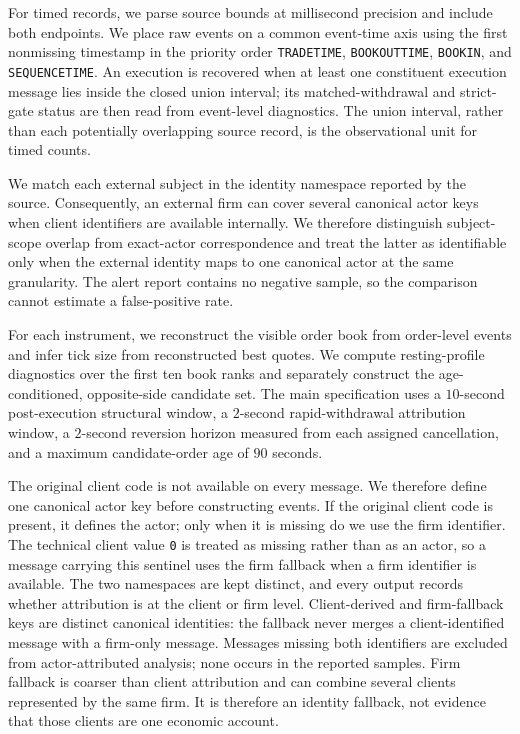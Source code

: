 \documentclass[11pt]{article}
\begin{document}
For timed records, we parse source bounds at millisecond precision and include both endpoints. We place raw events on a
common event-time axis using the first nonmissing timestamp in the priority order \texttt{TRADETIME}, \texttt{BOOKOUTTIME},
\texttt{BOOKIN}, and \texttt{SEQUENCETIME}. An execution is recovered when at least one constituent execution message lies
inside the closed union interval; its matched-withdrawal and strict-gate status are then read from event-level diagnostics.
The union interval, rather than each potentially overlapping source record, is the observational unit for timed counts.

We match each external subject in the identity namespace reported by the source. Consequently, an external firm can cover
several canonical actor keys when client identifiers are available internally. We therefore distinguish subject-scope overlap
from exact-actor correspondence and treat the latter as identifiable only when the external identity maps to one canonical
actor at the same granularity. The alert report contains no negative sample, so the comparison cannot estimate a
false-positive rate.

For each instrument, we reconstruct the visible order book from order-level events and infer tick size from reconstructed best
quotes. We compute resting-profile diagnostics over the first ten book ranks and separately construct the age-conditioned,
opposite-side candidate set. The main specification uses a $10$-second post-execution structural window, a $2$-second
rapid-withdrawal attribution window, a $2$-second reversion horizon measured from each assigned cancellation, and a maximum
candidate-order age of $90$ seconds.

The original client code is not available on every message. We therefore define one canonical actor key before constructing
events. If the original client code is present, it defines the actor; only when it is missing do we use the firm identifier.
The technical client value \texttt{0} is treated as missing rather than as an actor, so a message carrying this sentinel uses
the firm fallback when a firm identifier is available. The two namespaces are kept distinct, and every output records whether
attribution is at the client or firm level. Client-derived and firm-fallback keys are distinct canonical identities: the
fallback never merges a client-identified message with a firm-only message. Messages missing both identifiers are excluded
from actor-attributed analysis; none occurs in the reported samples. Firm fallback is coarser than client attribution and
can combine several clients represented by the same firm. It is therefore an identity fallback, not evidence that those
clients are one economic account.
\end{document}
